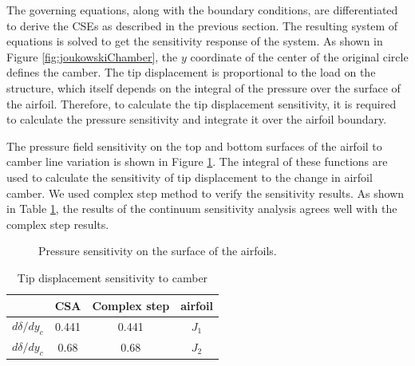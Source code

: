 \documentclass[12pt]{aiaa-pretty}
\begin{document}
The governing equations, along with the boundary conditions, are differentiated to derive the CSEs as described in the previous section. The resulting system of equations is solved to get the sensitivity response of the system. As shown in Figure \ref{fig:joukowskiChamber}, the $y$ coordinate of the center of the original circle defines the camber. The tip displacement is proportional to the load on the structure, which itself depends on the integral of the pressure over the surface of the airfoil. Therefore, to calculate the tip displacement sensitivity, it is required to calculate the pressure sensitivity and integrate it over the airfoil boundary.

The pressure field sensitivity on the top and bottom surfaces of the airfoil to camber line variation is shown in Figure \ref{fig:joukowskiChamberSensitivity}. The integral of these functions are used to calculate the sensitivity of tip displacement to the change in airfoil camber. We used complex step method to verify the sensitivity results. As shown in Table \ref{table:sensitivity}, the results of the continuum sensitivity analysis agrees well with the complex step results.

%
	\begin{figure}[H]
		\centering
		\quad
		\caption{Pressure sensitivity on the surface of the airfoils.}
		\label{fig:joukowskiChamberSensitivity}
	\end{figure}
%

%
\begin{table}[H]
\centering
\begin{tabular}{c|c|c|c}
 & \multicolumn{1}{c|}{CSA} & \multicolumn{1}{c|}{Complex step} & airfoil \\ \hline
$d\delta/dy_c$ & 0.441 & 0.441 & $J_1$ \\ \hline
$d\delta/dy_c$ & 0.68 & 0.68 & $J_2$ \\
\end{tabular}
\caption{Tip displacement sensitivity to camber}
\label{table:sensitivity}
\end{table}
%
\end{document}
